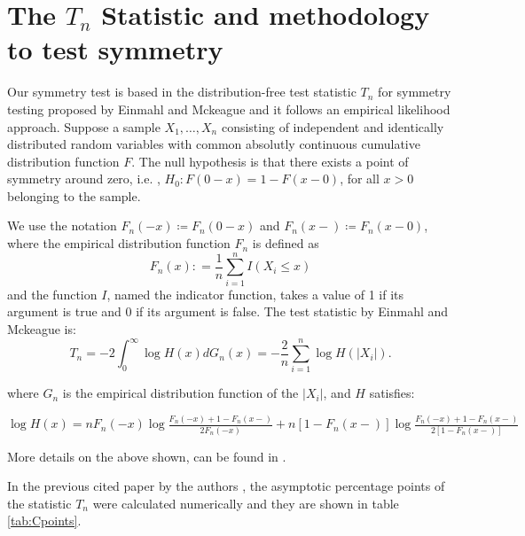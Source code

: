 \documentclass{elsarticle}
\begin{document}
\section{The $T_{n}$ Statistic and methodology to test symmetry}
\label{sec:Tn}

Our symmetry test is based in the distribution-free test statistic $T_{n}$ for symmetry testing proposed by Einmahl and Mckeague \cite{Einmahl} and it follows an empirical likelihood approach.
Suppose a sample $X_{1},\ldots,X_{n}$ consisting of independent and identically distributed random variables with  common absolutly continuous cumulative distribution function $F$.
The null hypothesis is that there exists a point of symmetry around zero, i.e. , $H_{0}:F(0-x)=1-F(x-0)$, for all $x>0$ belonging to the sample.

We use the notation $F_n(-x) \coloneqq F_n(0-x)$ and $F_n(x-) \coloneqq F_n(x-0)$, where the empirical distribution function $F_n$ is defined as $$F_n(x): = \frac{1}{n}\sum_{i=1}^{n} I(X_{i}\leq x)$$ and the function $I$, named the indicator function, takes a value of 1 if its argument is true and 0 if its argument is false. The test statistic by Einmahl and Mckeague is:
\begin{equation}
T_{n}=-2\int_{0}^{\infty} \log H(x)dG_{n}(x)=-\frac{2}{n}\sum_{i=1}^{n} \log H \left( \left| X_{i} \right| \right). 
\label{ts1}
\end{equation}

where $G_{n}$ is the empirical distribution function of the $\left| X_{i} \right|$, and $H$ satisfies:

$ \log H(x) = nF_n \left( { - x} \right)\log \frac{{F_n \left( { - x} \right) + 1 - F_n (x - )}}{{2F_n \left( { - x} \right)}}+n\left[ {1 - F_n \left( {x - } \right)} \right]\log \frac{{F_n ( - x) + 1- F_n (x - )}}{{2\left[ {1 - F_n \left( {x - } \right)} \right]}} $

More details on the above shown, can be found in \cite{Einmahl}.

In the previous cited paper by the authors \cite{Coronel-Montoya}, the asymptotic percentage points of the statistic $T_{n}$ were calculated numerically and they are shown in table \ref{tab:Cpoints}.
\end{document}
